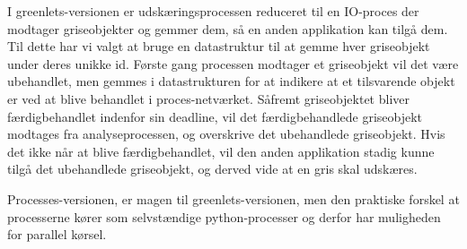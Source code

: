 I greenlets-versionen er udskæringsprocessen reduceret til en IO-proces der modtager griseobjekter og gemmer dem, så en anden applikation kan tilgå dem. Til dette har vi valgt at bruge en  datastruktur til at gemme  hver griseobjekt under deres unikke id. Første gang processen modtager et griseobjekt vil det være ubehandlet, men gemmes i datastrukturen for at indikere at et tilsvarende objekt er ved at blive behandlet i proces-netværket. Såfremt griseobjektet bliver færdigbehandlet indenfor sin deadline, vil det færdigbehandlede griseobjekt modtages fra analyseprocessen, og overskrive det ubehandlede griseobjekt. Hvis det ikke når at blive færdigbehandlet, vil den anden applikation stadig kunne tilgå det ubehandlede griseobjekt, og derved vide at en gris skal udskæres. 

Processes-versionen, er magen til greenlets-versionen, men den praktiske forskel at processerne kører som selvstændige python-processer og derfor har muligheden for parallel kørsel. 

